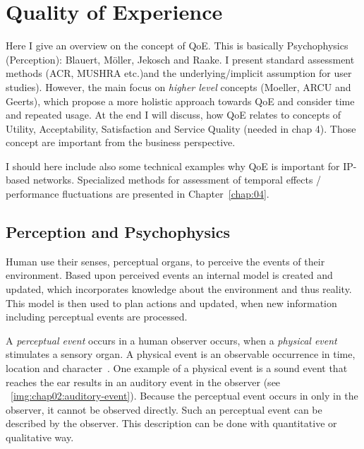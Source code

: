 \chapter{Quality of Experience}\label{chap:02}
\begin{chapter-abstract}
Here I give an overview on the concept of \ac{QoE}.
This is basically Psychophysics (Perception): Blauert, Möller, Jekosch and Raake.
I present standard assessment methods (\ac{ACR}, \ac{MUSHRA} etc.)and the underlying/implicit assumption for user studies).
However, the main focus on \textit{higher level} concepts (Moeller, ARCU and Geerts), which propose a more holistic approach towards \ac{QoE} and consider time and repeated usage.
At the end I will discuss, how QoE relates to concepts of Utility, Acceptability, Satisfaction and Service Quality (needed in chap 4).
Those concept are important from the business perspective.

I should here include also some technical examples why \ac{QoE} is important for \ac{IP}-based networks.
Specialized methods for assessment of temporal effects / performance fluctuations are presented in Chapter~\ref{chap:04}.
\end{chapter-abstract}


\section{Perception and Psychophysics}
Human use their senses, \ie perceptual organs, to perceive the events of their environment.
Based upon perceived events an internal model is created and updated, which incorporates knowledge about the environment and thus reality.
This model is then used to plan actions and updated, when new information including perceptual events are processed.

A \emph{perceptual event} occurs in a human observer occurs, when a \emph{physical event} stimulates a  sensory organ.
A physical event is an observable occurrence in time, location and character~\cite{callet_qualinet_2013}.
One example of a physical event is a sound event that reaches the ear results in an auditory event in the observer (see ~\ref{img:chap02:auditory-event}).
Because the perceptual event occurs in only in the observer, it cannot be observed directly.
Such an perceptual event can be described by the observer. %
This description can be done with quantitative or qualitative way.


